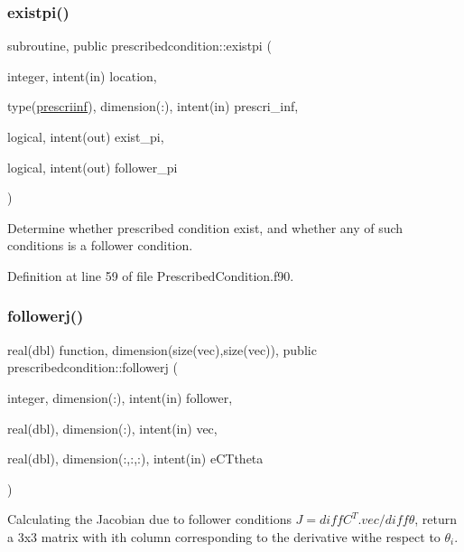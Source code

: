 \subsubsection{\texorpdfstring{existpi()}{existpi()}}
{\footnotesize\ttfamily subroutine, public prescribedcondition\+::existpi (\begin{DoxyParamCaption}\item[{integer, intent(in)}]{location,  }\item[{type(\hyperlink{structprescribedcondition_1_1prescriinf}{prescriinf}), dimension(\+:), intent(in)}]{prescri\+\_\+inf,  }\item[{logical, intent(out)}]{exist\+\_\+pi,  }\item[{logical, intent(out)}]{follower\+\_\+pi }\end{DoxyParamCaption})}



Determine whether prescribed condition exist, and whether any of such conditions is a follower condition. 



Definition at line 59 of file Prescribed\+Condition.\+f90.

\mbox{\label{namespaceprescribedcondition_a4c109cd4a8df6fedff99e15f448cf944}} 
\subsubsection{\texorpdfstring{followerj()}{followerj()}}
{\footnotesize\ttfamily real(dbl) function, dimension(size(vec),size(vec)), public prescribedcondition\+::followerj (\begin{DoxyParamCaption}\item[{integer, dimension(\+:), intent(in)}]{follower,  }\item[{real(dbl), dimension(\+:), intent(in)}]{vec,  }\item[{real(dbl), dimension(\+:,\+:,\+:), intent(in)}]{e\+C\+Ttheta }\end{DoxyParamCaption})}



Calculating the Jacobian due to follower conditions $ J=diff{C^T.vec}/diff\theta $, return a 3x3 matrix with ith column corresponding to the derivative withe respect to $ \theta_i $. 



